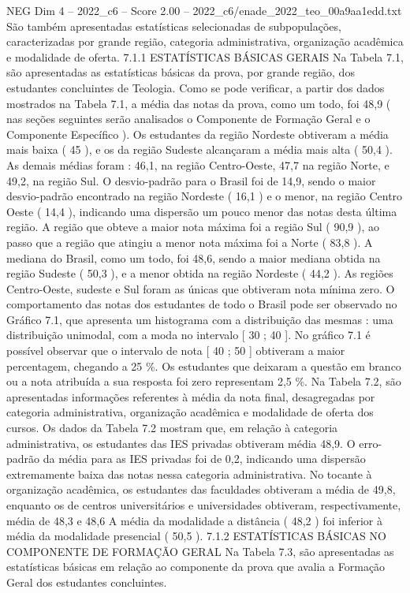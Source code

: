 \begin{textsample}{NEG Dim 4 – 2022\_c6 – Score 2.00 – 2022\_c6/enade\_2022\_teo\_00a9aa1edd.txt}
São também apresentadas estatísticas selecionadas de subpopulações, caracterizadas por grande região, categoria administrativa, organização acadêmica e modalidade de oferta. 7.1.1 ESTATÍSTICAS BÁSICAS GERAIS Na Tabela 7.1, são apresentadas as estatísticas básicas da prova, por grande região, dos estudantes concluintes de Teologia.
Como se pode verificar, a partir dos dados mostrados na Tabela 7.1, a média das notas da prova, como um todo, foi 48,9 ( nas seções seguintes serão analisados o Componente de Formação Geral e o Componente Específico ).
Os estudantes da região Nordeste obtiveram a média mais baixa ( 45 ), e os da região Sudeste alcançaram a média mais alta ( 50,4 ).
As demais médias foram : 46,1, na região Centro-Oeste, 47,7 na região Norte, e 49,2, na região Sul.
O desvio-padrão para o Brasil foi de 14,9, sendo o maior desvio-padrão encontrado na região Nordeste ( 16,1 ) e o menor, na região Centro Oeste ( 14,4 ), indicando uma dispersão um pouco menor das notas desta última região.
A região que obteve a maior nota máxima foi a região Sul ( 90,9 ), ao passo que a região que atingiu a menor nota máxima foi a Norte ( 83,8 ).
A mediana do Brasil, como um todo, foi 48,6, sendo a maior mediana obtida na região Sudeste ( 50,3 ), e a menor obtida na região Nordeste ( 44,2 ).
As regiões Centro-Oeste, sudeste e Sul foram as únicas que obtiveram nota mínima zero.
O comportamento das notas dos estudantes de todo o Brasil pode ser observado no Gráfico 7.1, que apresenta um histograma com a distribuição das mesmas : uma distribuição unimodal, com a moda no intervalo [ 30 ; 40 ].
No gráfico 7.1 é possível observar que o intervalo de nota [ 40 ; 50 ] obtiveram a maior percentagem, chegando a 25 \%.
Os estudantes que deixaram a questão em branco ou a nota atribuída a sua resposta foi zero representam 2,5 \%.
Na Tabela 7.2, são apresentadas informações referentes à média da nota final, desagregadas por categoria administrativa, organização acadêmica e modalidade de oferta dos cursos.
Os dados da Tabela 7.2 mostram que, em relação à categoria administrativa, os estudantes das IES privadas obtiveram média 48,9.
O erro-padrão da média para as IES privadas foi de 0,2, indicando uma dispersão extremamente baixa das notas nessa categoria administrativa.
No tocante à organização acadêmica, os estudantes das faculdades obtiveram a média de 49,8, enquanto os de centros universitários e universidades obtiveram, respectivamente, média de 48,3 e 48,6 A média da modalidade a distância ( 48,2 ) foi inferior à média da modalidade presencial ( 50,5 ). 7.1.2 ESTATÍSTICAS BÁSICAS NO COMPONENTE DE FORMAÇÃO GERAL Na Tabela 7.3, são apresentadas as estatísticas básicas em relação ao componente da prova que avalia a Formação Geral dos estudantes concluintes.

\end{textsample}
